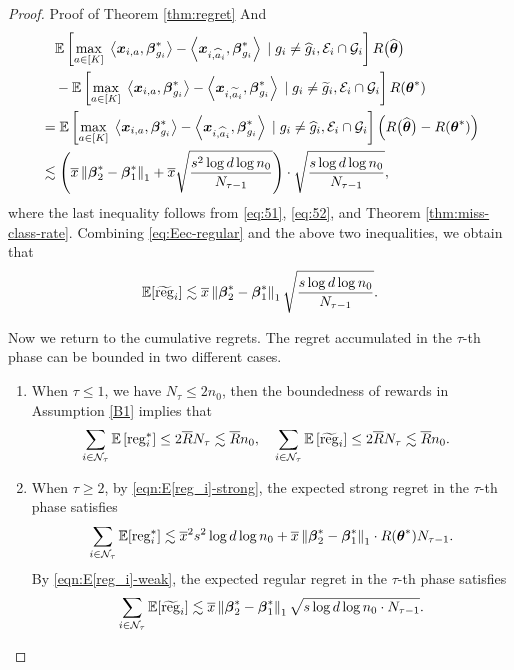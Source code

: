 \begin{proof}{Proof of Theorem \ref{thm:regret}}
And 
\begin{align*}
	&\quad \mathbb{E}\left[ \underset{a\in [K]}{\max}\; \left\langle \boldsymbol{x}_{i,a}, \boldsymbol{\beta}^*_{g_i} \right\rangle - \left\langle \boldsymbol{x}_{i,\widehat a_i}, \boldsymbol{\beta}^*_{g_i} \right\rangle \;|\; g_i \neq \widehat{g}_i,  {\cal E}_{i} \cap {\cal G}_{i} \right] R\big(\widehat{\boldsymbol{\theta}}\big) \\
	&\quad - \mathbb{E}\left[ \underset{a\in [K]}{\max}\; \left\langle \boldsymbol{x}_{i,a}, \boldsymbol{\beta}^*_{g_i} \right\rangle - \left\langle \boldsymbol{x}_{i,\widetilde a_i}, \boldsymbol{\beta}^*_{g_i} \right\rangle \;|\; g_i\neq \widetilde{g}_i, {\cal E}_{i} \cap {\cal G}_i \right] R(\boldsymbol{\theta}^*)\\
	& = \mathbb{E}\left[ \underset{a\in [K]}{\max}\; \left\langle \boldsymbol{x}_{i,a}, \boldsymbol{\beta}^*_{g_i} \right\rangle - \left\langle \boldsymbol{x}_{i,\widehat a_i}, \boldsymbol{\beta}^*_{g_i} \right\rangle \;|\; g_i \neq\widehat{g}_i,  {\cal E}_{i} \cap {\cal G}_{i} \right] \left(R\big(\widehat{\boldsymbol{\theta}}\big)-R(\boldsymbol{\theta}^*)\right)\\
	& \lesssim \left(\overline{x}\left\lVert\boldsymbol{\beta}_2^*-\boldsymbol{\beta}_1^*\right\rVert_1
	+  \overline{x}\sqrt{\frac{s^2\log d \log n_0 }{N_{\tau-1}}}\right) \cdot \sqrt{\frac{s\log d \log n_0}{N_{\tau-1}}},
\end{align*}
where the last inequality follows from \eqref{eq:51}, \eqref{eq:52}, and Theorem \ref{thm:miss-class-rate}. Combining \eqref{eq:Eec-regular} and the above two inequalities, we obtain that 
\[ \mathbb{E}[\widetilde{\operatorname{reg}}_i] \lesssim \overline{x}\left\lVert\boldsymbol{\beta}_2^*-\boldsymbol{\beta}_1^*\right\rVert_1\sqrt{\frac{s\log d \log n_0}{N_{\tau-1}}}.\]

Now we return to the cumulative regrets. The regret accumulated in the $\tau$-th phase can be bounded in two different cases. 
\begin{enumerate}[label=(\roman*)]
	\item When $\tau\leq1$, we have $N_{\tau} \leq 2n_0$, then the boundedness of rewards in Assumption \ref{B1} implies that
	\begin{align*}
		& \sum_{i\in{\cal N}_{\tau}} \mathbb{E}\left[ \operatorname{reg}^{*}_i \right] \leq 2\overline{R} N_{\tau} \lesssim \overline{R}n_0, \quad  \sum_{i\in{\cal N}_{\tau}} \mathbb{E}\left[ \widetilde{\operatorname{reg}}_i \right] \leq 2\overline{R} N_{\tau} \lesssim \overline{R}n_0. 
	\end{align*}
	\item When $\tau \geq 2$, by \eqref{eqn:E[reg_i]-strong}, the expected strong regret in the $\tau$-th phase satisfies
	\begin{align*}
		\sum_{i\in {\cal N}_{\tau}}\mathbb{E}[\operatorname{reg}^{*}_i] \lesssim
		\overline{x}^2s^2\log d \log n_0 + \overline{x} \left\lVert\boldsymbol{\beta}_2^* - \boldsymbol{\beta}_1^*\right\rVert_1\cdot R(\boldsymbol{\theta}^*)N_{\tau-1}.
	\end{align*} 
	By \eqref{eqn:E[reg_i]-weak}, the expected regular regret in the $\tau$-th phase satisfies
	\begin{align*}
		\sum_{i\in {\cal N}_{\tau}}\mathbb{E}[\widetilde{\operatorname{reg}}_i] \lesssim \overline{x} \left\lVert\boldsymbol{\beta}_2^*-\boldsymbol{\beta}_1^*\right\rVert_1\sqrt{s\log d \log n_0 \cdot N_{\tau-1}}.
	\end{align*} 
\end{enumerate}


\end{proof}

